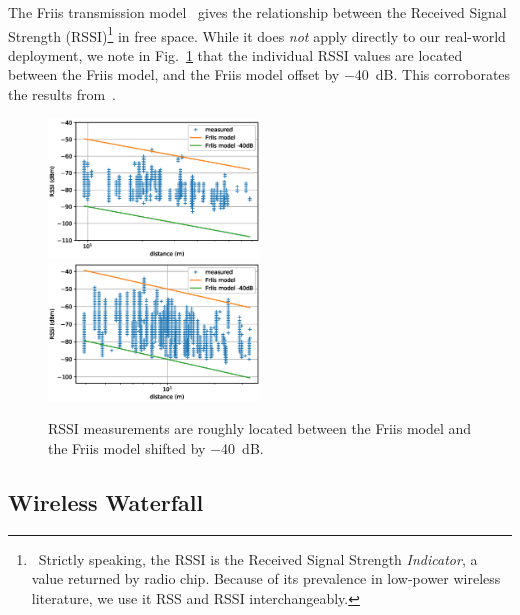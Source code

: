 \documentclass{elsarticle}
\begin{document}
The Friis transmission model~\cite{saunders07antennas} gives the relationship between the Received Signal Strength (RSSI)\footnote{~Strictly speaking, the RSSI is the Received Signal Strength \textit{Indicator}, a value returned by radio chip. Because of its prevalence in low-power wireless literature, we use it RSS and RSSI interchangeably.} in free space.
While it does \textit{not} apply directly to our real-world deployment, we note in Fig.~\ref{fig:pister_hack} that the individual RSSI values are located between the Friis model, and the Friis model offset by $-$40~dB.
This corroborates the results from~\cite{zats10wireless}.

\begin{figure}[h]
    \includegraphics[width=0.5\textwidth]{pister_hack_peach.eps}
    \includegraphics[width=0.5\textwidth]{pister_hack.eps}
    \caption{RSSI measurements are roughly located between the Friis model and the Friis model shifted by $-$40~dB.}
    \label{fig:pister_hack}
\end{figure}

\subsection{Wireless Waterfall}
\label{sec:waterfall}

\end{document}
